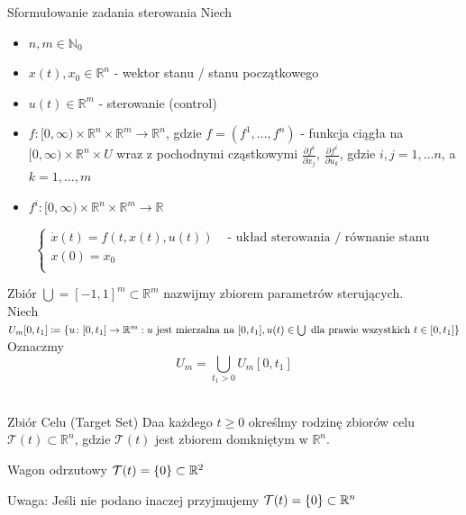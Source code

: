 \begin{definition}{Sformułowanie zadania sterowania}{}{}
    Niech \begin{itemize}
        \item $n, m \in \mathbb{N}_0$
        \item $x(t), x_0 \in \mathbb{R}^n$ - wektor stanu / stanu początkowego
        \item $u(t) \in \mathbb{R}^m$ - sterowanie (control)
        \item $f \colon [0, \infty) \times \mathbb{R}^n \times \mathbb{R}^m \to \mathbb{R}^n$, gdzie $f = (f^1, \dots, f^n)$ - funkcja ciągła na $[0, \infty) \times \mathbb{R}^n \times U$ wraz z pochodnymi cząstkowymi $\frac{\partial f^i}{\partial x_j}$, $\frac{\partial f^i}{\partial u_k}$, gdzie $i, j = 1, \dots n$, a $k = 1, \dots, m$
        \item $f^i \colon [0, \infty) \times \mathbb{R}^n \times \mathbb{R}^m \to \mathbb{R}$
    \end{itemize}
    
    \[
    \begin{cases}
        \dot{x}(t) = f(t, x(t), u(t)) & \text{ - układ sterowania / równanie stanu} \\
        x(0) = x_0 & \\
    \end{cases}
    \label{eq:controlEquation}
    \]

    Zbiór $\bigcup = [-1, 1]^m \subset \mathbb{R}^m$ nazwijmy zbiorem parametrów sterujących. \\
    Niech $U_m[0, t_1] \coloneqq \{ u \colon [0, t_1] \to \mathbb{R}^m : u \text{ jest mierzalna na } [0, t_1], u(t) \in \bigcup \text{ dla prawie wszystkich } t \in [0, t_1]  \}$ \\
    Oznaczmy $$U_m = \bigcup_{t_1 > 0} U_m[0, t_1]$$ \\
\end{definition}

\begin{definition}{Zbiór Celu (Target Set)}{}{}
    Daa każdego $t \geq 0$ określmy rodzinę zbiorów celu $\mathcal{T}(t) \subset \mathbb{R}^n$, gdzie $\mathcal{T}(t)$ jest zbiorem domkniętym w $\mathbb{R}^n$.
    \begin{example}[definition]{}{}{}
        Wagon odrzutowy $\mathcal{T}(t) = \{0\} \subset \mathbb{R}^2$
    \end{example}

    Uwaga: Jeśli nie podano inaczej przyjmujemy $\mathcal{T}(t) = \{0\} \subset \mathbb{R}^n$
\end{definition}


